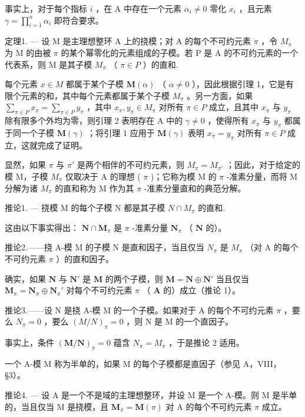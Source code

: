 事实上，对于每个指标 \(i\) ，在 A 中存在一个元素 \(\alpha_{i} \neq 0\) 零化 \(x_{i}\) ，且元素 \(\gamma = \prod_{i=1}^{n} \alpha_{i}\) 即符合要求。

定理1. --- 设 M 是主理想整环 A 上的挠模；对 A 的每个不可约元素 \(\pi\) ，令 \(M_{\pi}\) 为 M 的由被 \(\pi\) 的某个幂零化的元素组成的子模。若 P 是 A 的不可约元素的一个代表系，则 M 是其子模 \(M_{\pi}\) （ \(\pi \in P\) ）的直和.

每个元素 \(x \in M\) 都属于某个子模 \(\mathbf{M}(\alpha)\) （ \(\alpha \neq 0\) ），因此根据引理 1，它是有限个元素的和，其中每个元素都属于某个子模 \(M_{\pi}\) 。另一方面，如果 \(\sum_{\pi \in P} x_{\pi} = \sum_{\pi \in P} y_{\pi}\) ，其中 \(x_{\pi}, y_{\pi} \in M_{\pi}\) 对所有 \(\pi \in P\) 成立，且其中 \(x_{\pi}\) 与 \(y_{\pi}\) 除有限多个外均为零，则引理 2 表明存在 A 中的 \(\gamma \neq 0\) ，使得所有 \(x_{\pi}\) 与 \(y_{\pi}\) 都属于同一个子模 \(\mathbf{M}(\gamma)\) ；将引理 1 应用于 \(\mathbf{M}(\gamma)\) 表明 \(x_{\pi} = y_{\pi}\) 对所有 \(\pi \in P\) 成立，这就完成了证明。

显然，如果 \(\pi\) 与 \(\pi'\) 是两个相伴的不可约元素，则 \(M_{\pi} = M_{\pi'}\) ；因此，对于给定的模 M，子模 \(M_{\pi}\) 仅取决于 A 的理想 ( \(\pi\) )；它称为模 M 的 \(\pi\) -准素分量，而将 M 分解为诸 \(M_{\pi}\) 的直和称为 M 作为其 \(\pi\) -准素分量直和的典范分解。

推论1. --- 挠模 M 的每个子模 N 都是其子模 \(N \cap M_{\pi}\) 的直和.

这由以下事实得出： \(\mathbf{N} \cap \mathbf{M}_{\pi}\) 是 \(\pi\) -准素分量 \(\mathbf{N}_{\pi}\) （ \(\mathbf{N}\) 的）。

推论2.——挠 A-模 M 的子模 N 是直和因子，当且仅当 \(N_{\pi}\) 是 \(M_{\pi}\) （对 A 的每个不可约元素 \(\pi\) ）的直和因子。

确实，如果 \(\mathbf{N}\) 与 \(\mathbf{N}'\) 是 \(\mathbf{M}\) 的两个子模，则 \(\mathbf{M} = \mathbf{N} \oplus \mathbf{N}'\) 当且仅当 \(\mathbf{M}_{\pi} = \mathbf{N}_{\pi} \oplus \mathbf{N}_{\pi}'\) 对每个不可约元素 \(\pi\) （ \(\mathbf{A}\) 的）成立（推论 1）。

推论3.——设 N 是挠 A-模 M 的一个子模。如果对于 A 的每个不可约元素 \(\pi\) ，要么 \(N_{\pi} = 0\) ，要么 \((M/N)_{\pi} = 0\) ，则 N 是 M 的一个直因子。

事实上，条件 \((\mathbf{M}/\mathbf{N})_{\pi}=0\) 蕴含 \(N_{\pi}=M_{\pi}\) ，于是推论 2 适用。

一个 A-模 M 称为半单的，如果 M 的每个子模都是直因子（参见 A，VIII，§3）。

推论4. --- 设 A 是一个不是域的主理想整环，并设 M 是一个 A-模。则 M 是半单的，当且仅当 M 是挠模，且 \(\mathbf{M}_{\pi} = \mathbf{M}(\pi)\) 对 A 的每个不可约元素 \(\pi\) 成立。

